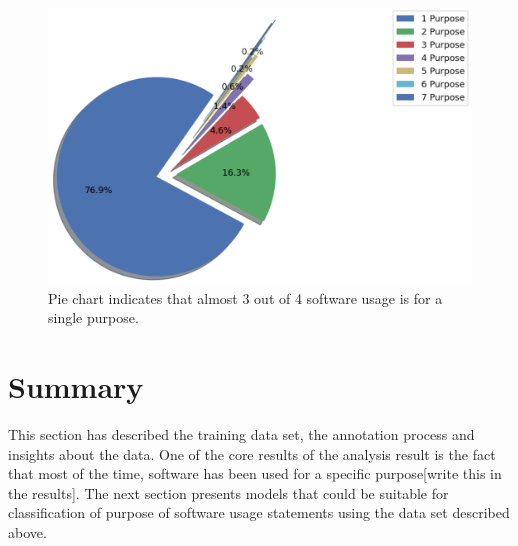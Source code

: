 \begin{figure}[htbp]
	\centering
	\includegraphics[width=.65\textwidth]{4.graphics/figures/analysisresults/8.counts of software purpose pie}
	\caption{Pie chart indicates that almost 3 out of 4 software usage is for a single purpose.  }
	\label{fig:chapter04:pie}
\end{figure}

\section{Summary }
\label{subsec:dataset:Analysis:Summary}

This section has described the training data set, the annotation process and insights about the data. One of the core results of the analysis result is the fact that most of the time, software has been used for a specific purpose[write this in the results]. The next section presents models that could be suitable for classification of purpose of software usage statements using the data set described above. 

